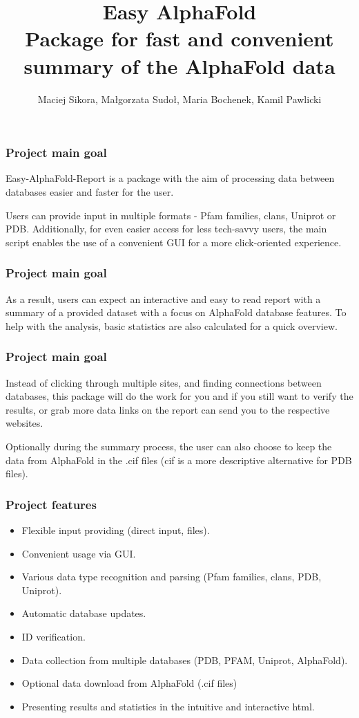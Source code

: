 \documentclass[10pt]{beamer}
\title{Easy AlphaFold  \\
Package for fast and convenient summary of the AlphaFold data}
\author{Maciej Sikora, Małgorzata Sudoł, Maria Bochenek, Kamil Pawlicki}
\begin{document}
\frame{\titlepage}


\begin{frame}
\frametitle{Project main goal}
Easy-AlphaFold-Report is a package with the aim of processing data between databases easier and faster for the user.\newline

Users can provide input in multiple formats - Pfam families, clans, Uniprot or PDB. Additionally, for even easier access for less tech-savvy users, the main script enables the use of a convenient GUI for a more click-oriented experience.\newline
\end{frame}


\begin{frame}
\frametitle{Project main goal}
As a result, users can expect an interactive and easy to read report with a summary of a provided dataset with a focus on AlphaFold database features. To help with the analysis, basic statistics are also calculated for a quick overview.\newline
\end{frame}

\begin{frame}
\frametitle{Project main goal}
Instead of clicking through multiple sites, and finding connections between databases, this package will do the work for you and if you still want to verify the results, or grab more data links on the report can send you to the respective websites.\newline

Optionally during the summary process, the user can also choose to keep the data from AlphaFold in the .cif files (cif is a more descriptive alternative for PDB files).
\end{frame}


\begin{frame}
\frametitle{Project features}
\begin{itemize}
\item Flexible input providing (direct input, files).
\item Convenient usage via GUI.
\item Various data type recognition and parsing (Pfam families, clans, PDB, Uniprot).
\item Automatic database updates.
\item ID verification.
\item Data collection from multiple databases (PDB, PFAM, Uniprot, AlphaFold).
\item Optional data download from AlphaFold (.cif files)
\item Presenting results and statistics in the intuitive and interactive html.
\end{itemize}
\end{frame}
\end{document}
